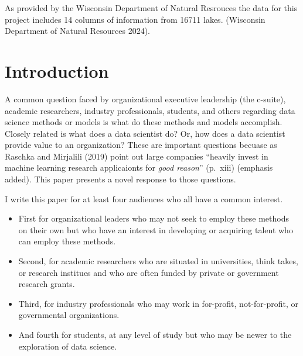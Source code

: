 \documentclass[
]{article}
\providecommand{\tightlist}{%
  \setlength{\itemsep}{0pt}\setlength{\parskip}{0pt}}\usepackage{longtable,booktabs,array}
\begin{document}
\begin{tcolorbox}[enhanced jigsaw, coltitle=black, toprule=.15mm, arc=.35mm, bottomtitle=1mm, opacityback=0, leftrule=.75mm, left=2mm, colframe=quarto-callout-note-color-frame, toptitle=1mm, titlerule=0mm, breakable, colbacktitle=quarto-callout-note-color!10!white, colback=white, bottomrule=.15mm, title=\textcolor{quarto-callout-note-color}{\faInfo}\hspace{0.5em}{Note}, rightrule=.15mm, opacitybacktitle=0.6]

As provided by the Wisconsin Department of Natural Resrouces the data
for this project includes 14 columns of information from 16711 lakes.
(Wisconsin Department of Natural Resources 2024).

\end{tcolorbox}

\section{Introduction}\label{introduction}

A common question faced by organizational executive leadership (the
c-suite), academic researchers, industry professionals, students, and
others regarding data science methods or models is what do these methods
and models accomplish. Closely related is what does a data scientist do?
Or, how does a data scientist provide value to an organization? These
are important questions becuase as Raschka and Mirjalili (2019) point
out large companies ``heavily invest in machine learning research
applicaionts for \emph{good reason}'' (p.~xiii) (emphasis added). This
paper presents a novel response to those questions.

I write this paper for at least four audiences who all have a common
interest.

\begin{itemize}
\tightlist
\item
  First for organizational leaders who may not seek to employ these
  methods on their own but who have an interest in developing or
  acquiring talent who can employ these methods.
\item
  Second, for academic researchers who are situated in universities,
  think takes, or research institues and who are often funded by private
  or government research grants.
\item
  Third, for industry professionals who may work in for-profit,
  not-for-profit, or governmental organizations.
\item
  And fourth for students, at any level of study but who may be newer to
  the exploration of data science.
\end{itemize}
\end{document}
